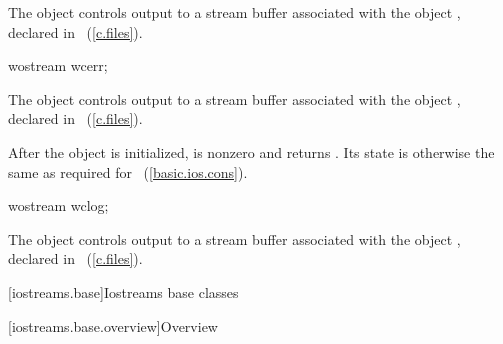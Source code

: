 \begin{itemdescr}
\pnum
The object
controls output to a stream buffer
associated with the object
,
declared in
%
~(\ref{c.files}).
\end{itemdescr}

%
\begin{itemdecl}
wostream wcerr;
\end{itemdecl}

\begin{itemdescr}
\pnum
The object
controls output to a stream buffer
associated with the object
,
declared in
%
~(\ref{c.files}).

\pnum
After the object
is initialized,
is nonzero and  returns .
Its state is otherwise the same as required for
~(\ref{basic.ios.cons}).
\end{itemdescr}

%
\begin{itemdecl}
wostream wclog;
\end{itemdecl}

\begin{itemdescr}
\pnum
The object
controls output to a stream buffer
associated with the object
,
declared in
%
~(\ref{c.files}).
\end{itemdescr}

[iostreams.base]{Iostreams base classes}

[iostreams.base.overview]{Overview}

%

